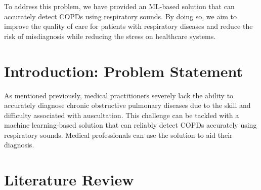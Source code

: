 \documentclass[10pt,twocolumn,letterpaper]{article}
\begin{document}
To address this problem, we have provided an ML-based solution that can accurately detect COPDs using respiratory sounds. By doing so, we aim to improve the quality of care for patients with respiratory
diseases and reduce the risk of misdiagnosis while reducing the stress on healthcare systems.

\section{Introduction: Problem Statement}
As mentioned previously, medical practitioners severely lack the ability to accurately diagnose chronic obstructive
pulmonary diseases due to the skill and difficulty associated with auscultation. This challenge can be tackled
with a machine learning-based solution that can reliably detect COPDs accurately using respiratory sounds.
Medical professionals can use the solution to aid their diagnosis.

\section{Literature Review}
\end{document}
